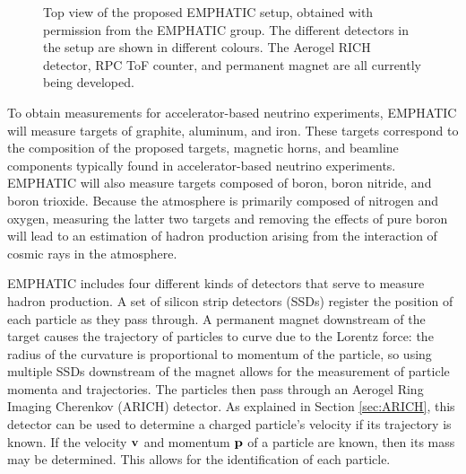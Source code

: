 \begin{figure}[] 
\centering
{}
\caption{Top view of the proposed EMPHATIC setup, obtained with permission from the EMPHATIC group. The different detectors in the setup are shown in different colours. The Aerogel RICH detector, RPC ToF counter, and permanent magnet are all currently being developed.}

\label{fig:EMPHATIC}       %
\end{figure}

To obtain measurements for accelerator-based neutrino experiments, \ac{EMPHATIC} will measure targets of graphite, aluminum, and iron.
These targets correspond to the composition of the proposed targets, magnetic horns, and beamline components typically found in accelerator-based neutrino experiments.
\ac{EMPHATIC} will also measure targets composed of boron, boron nitride, and boron trioxide.
Because the atmosphere is primarily composed of nitrogen and oxygen, measuring the latter two targets and removing the effects of pure boron will lead to an estimation of hadron production arising from the interaction of cosmic rays in the atmosphere. 

\ac{EMPHATIC} includes four different kinds of detectors that serve to measure hadron production.
A set of silicon strip detectors (SSDs) register the position of each particle as they pass through.
A permanent magnet downstream of the target causes the trajectory of particles to curve due to the Lorentz force: the radius of the curvature is proportional to momentum of the particle, so using multiple SSDs downstream of the magnet allows for the measurement of particle momenta and trajectories.
The particles then pass through an Aerogel Ring Imaging Cherenkov (ARICH) detector.
As explained in Section \ref{sec:ARICH}, this detector can be used to determine a charged particle's velocity if its trajectory is known. 
If the velocity $\bf{v}$ and momentum $\bf{p}$ of a particle are known, then its mass may be determined.
This allows for the identification of each particle. 

